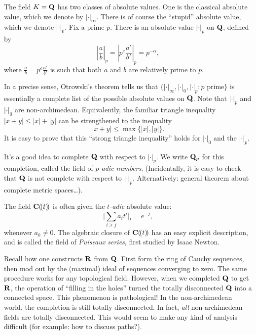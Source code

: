 \documentclass[oneside]{article}
\begin{document}
\begin{example}
The field $K=\mathbf{Q}$ has two classes of absolute values. One is the classical 
absolute value, which we denote by $|\cdot|_\infty$. There is of course the 
``stupid'' absolute value, which we denote $|\cdot|_0$. Fix a prime $p$. There 
is an absolute value $|\cdot|_p$ on $\mathbf{Q}$, defined by 
\[
  \left|\frac a b\right|_p = \left|p^e \frac{a'}{b'}\right|_p = p^{-\alpha} ,
\]
where $\frac a b=p^e \frac{a'}{b'}$ is such that both $a$ and $b$ are 
relatively prime to $p$. 
\end{example}

In a precise sense, Otrowski's theorem tells us that 
$\{|\cdot|_\infty,|\cdot|_0,|\cdot|_p:\text{$p$ prime}\}$ is essentially a 
complete list of the possible absolute values on $\mathbf{Q}$. Note that 
$|\cdot|_p$ and $|\cdot|_0$ are non-archimedean. Equivalently, the familiar 
triangle inequality $|x+y|\leqslant |x|+|y|$ can be strengthened to the 
inequality 
\[
  |x+y| \leqslant \max\{|x|,|y|\} .
\]
It is easy to prove that this ``strong triangle inequality'' holds for 
$|\cdot|_0$ and the $|\cdot|_p$. 

It's a good idea to complete $\mathbf{Q}$ with respect to $|\cdot|_p$. We write 
$\mathbf{Q}_p$ for this completion, called the field of \emph{$p$-adic numbers}. 
(Incidentally, it is easy to check that $\mathbf{Q}$ is not complete with respect 
to $|\cdot|_p$. Alternatively: general theorem about complete metric spaces\ldots). 

\begin{example}
The field $\mathbf{C}(\!( t)\!)$ is often given the \emph{$t$-adic} absolute 
value: 
\[
  \bigg|\sum_{i\geqslant j} a_i t^i\bigg|_t = e^{-j} ,
\]
whenever $a_k\ne 0$. The algebraic closure of $\mathbf{C}(\!( t)\!)$ has an easy 
explicit description, and is called the field of \emph{Puiseaux series}, first 
studied by Isaac Newton. 
\end{example}

Recall how one constructs $\mathbf{R}$ from $\mathbf{Q}$. First form the ring of Cauchy 
sequences, then mod out by the (maximal) ideal of sequences converging to zero. 
The same procedure works for any topological field. However, when we completed 
$\mathbf{Q}$ to get $\mathbf{R}$, the operation of ``filling in the holes'' turned the 
totally disconnected $\mathbf{Q}$ into a connected space. This phenomenon is 
pathological! In the non-archimedean world, the completion is still totally 
disconnected. In fact, \emph{all} non-archimedean fields are totally 
disconnected. This would seem to make any kind of analysis difficult (for 
example: how to discuss paths?). 
\end{document}
